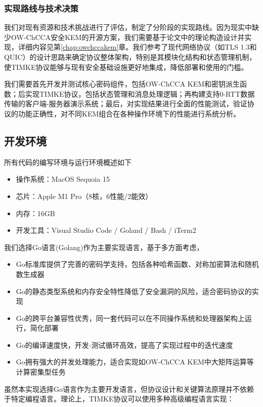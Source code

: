 \subsubsection{实现路线与技术决策}

我们对现有资源和技术挑战进行了评估，制定了分阶段的实现路线。因为现实中缺少OW-ChCCA安全KEM的开源方案，我们需要基于论文\cite{pan_lattice-based_2023}中的理论构造设计并实现，详细内容见第\ref{chap:owchccakem}章。我们参考了现代网络协议（如TLS 1.3和QUIC）的设计思路来确定协议整体架构，特别是其模块化结构和状态管理机制，使TIMKE协议能够与现有安全基础设施更好地集成，降低部署和使用的门槛。

我们需要首先开发并测试核心密码组件，包括OW-ChCCA KEM和密钥派生函数；后实现TIMKE协议，包括状态管理和消息处理逻辑；再构建支持0-RTT数据传输的客户端-服务器演示系统；最后，对实现结果进行全面的性能测试，验证协议的功能正确性，对不同KEM组合在各种操作环境下的性能进行系统分析。

\subsection{开发环境}
所有代码的编写环境与运行环境概述如下
\begin{itemize}
  \item 操作系统：MacOS Sequoia 15
  \item 芯片：Apple M1 Pro（8核，6性能/2能效）
  \item 内存：16GB
  \item 开发工具：Visual Studio Code / Goland / Bash / iTerm2
\end{itemize}

我们选择Go语言(Golang)作为主要实现语言，基于多方面考虑，
\begin{itemize}
  \item Go标准库提供了完善的密码学支持，包括各种哈希函数、对称加密算法和随机数生成器
  \item Go的静态类型系统和内存安全特性降低了安全漏洞的风险，适合密码协议的实现
  \item Go的跨平台兼容性优秀，同一套代码可以在不同操作系统和处理器架构上运行，简化部署
  \item Go的编译速度快，开发-测试循环高效，提高了实现过程中的迭代速度
  \item Go拥有强大的并发处理能力，适合实现如OW-ChCCA KEM中大矩阵运算等计算密集型任务
\end{itemize}

虽然本实现选择Go语言作为主要开发语言，但协议设计和关键算法原理并不依赖于特定编程语言。理论上，TIMKE协议可以使用多种高级编程语言实现：

